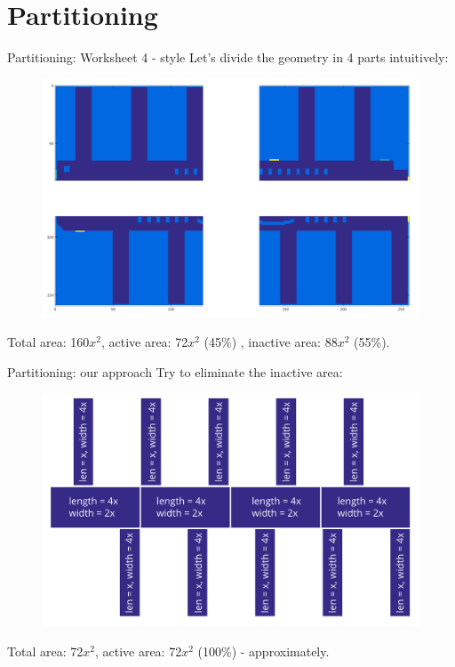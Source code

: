 \documentclass[9pt,pdftex]{beamer}
\begin{document}
\section{Partitioning}
\begin{frame}{Partitioning: Worksheet 4 - style}
 Let's divide the geometry in 4 parts intuitively:
 \begin{figure}
  \includegraphics[width=0.8\linewidth]{matlab_domain_WS4}
 \end{figure}
 Total area: 160$x^2$\pause, active area: 72$x^2$ (45\%) \pause, inactive area: 88$x^2$ (55\%).
\end{frame}

\begin{frame}{Partitioning: our approach}
 Try to eliminate the inactive area:
 \begin{figure}
  \includegraphics[width=0.8\linewidth]{actual_partitioning_sizes}
 \end{figure}
 Total area: 72$x^2$, active area: 72$x^2$ (100\%) - approximately.
\end{frame}
\end{document}
